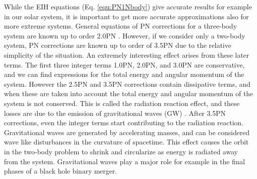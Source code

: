 \documentclass[english, oneside]{HYgradu}
\begin{document}
While the EIH equations (Eq. \ref{equ:PN1Nbody}) give accurate results for example in our solar system, it is important to get more accurate approximations also for more extreme systems. General equations of PN corrections for a three-body system are known up to order 2.0PN \citep{gravity}. However, if we consider only a two-body system, PN corrections are known up to order of 3.5PN due to the relative simplicity of the situation. An extremely interesting effect arises from these later terms. The first three integer terms 1.0PN, 2.0PN, and 3.0PN are conservative, and we can find expressions for the total energy and angular momentum of the system. However the 2.5PN and 3.5PN corrections contain dissipative terms, and when these are taken into account the total energy and angular momentum of the system is not conserved. This is called the radiation reaction effect, and these losses are due to the emission of gravitational waves (GW) \citep{gravwaves}. After 3.5PN corrections, even the integer terms start contributing to the radiation reaction. Gravitational waves are generated by accelerating masses, and can be considered wave like disturbances in the curvature of spacetime. This effect causes the orbit in the two-body problem to shrink and circularize as energy is radiated away from the system. Gravitational waves play a major role for example in the final phases of a black hole binary merger.
\end{document}
